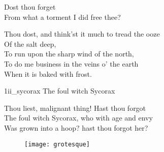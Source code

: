 \begin{verse_speech}[Prospero] 
Dost thou forget\\
From what a torment I did free thee?
\end{verse_speech}

	
\begin{verse_speech}[Prospero] 
Thou dost, and think'st it much to tread the ooze\\
Of the salt deep,\\
To run upon the sharp wind of the north,\\
To do me business in the veins o' the earth\\
When it is baked with frost.
\end{verse_speech}




\begin{pictures} %
	\begin{a4}
		\begin{colorbigpic}
			[1]
			{1ii_sycorax}
			{The foul witch Sycorax}
		\end{colorbigpic}
	\end{a4}
\end{pictures}



\begin{verse_speech}[Prospero] 
Thou liest, malignant thing! Hast thou forgot\\
The foul witch Sycorax, who with age and envy\\
Was grown into a hoop? hast thou forgot her?
\end{verse_speech}


	
	

\begin{letter}
	\begin{figure}[tb]
		\centering
		\texttt{[image: grotesque]}
	\end{figure}
\end{letter}
	
